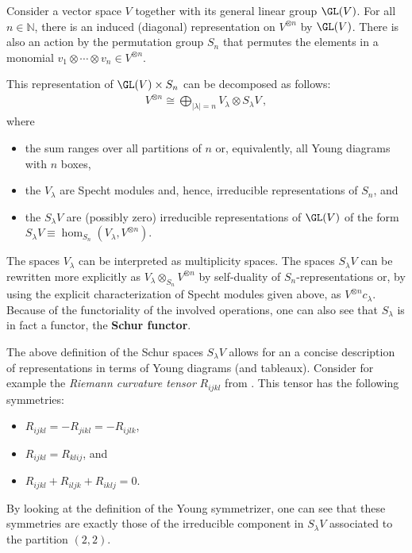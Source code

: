     Consider a vector space $V$ together with its general linear group $\GL(V)$. For all $n\in\mathbb{N}$, there is an induced (diagonal) representation on $V^{\otimes n}$ by $\GL(V)$. There is also an action by the permutation group $S_n$ that permutes the elements in a monomial $v_1\otimes\cdots\otimes v_n\in V^{\otimes n}$.
    \begin{theorem}
        This representation of $\GL(V)\times S_n$ can be decomposed as follows:
        \begin{gather}
            V^{\otimes n}\cong\bigoplus_{|\lambda|=n}V_\lambda\otimes S_\lambda V\,,
        \end{gather}
        where
        \begin{itemize}
            \item the sum ranges over all partitions of $n$ or, equivalently, all Young diagrams with $n$ boxes,
            \item the $V_\lambda$ are Specht modules and, hence, irreducible representations of $S_n$, and
            \item the $S_\lambda V$ are (possibly zero) irreducible representations of $\GL(V)$ of the form $S_\lambda V \equiv\hom_{S_n}(V_\lambda,V^{\otimes n})$.
        \end{itemize}
    \end{theorem}
    The spaces $V_\lambda$ can be interpreted as multiplicity spaces. The spaces $S_\lambda V$ can be rewritten more explicitly as $V_\lambda\otimes_{S_n} V^{\otimes n}$ by self-duality of $S_n$-representations or, by using the explicit characterization of Specht modules given above, as $V^{\otimes n}c_\lambda$. Because of the functoriality of the involved operations, one can also see that $S_\lambda$ is in fact a functor, the \textbf{Schur functor}.

    \begin{example}
        The above definition of the Schur spaces $S_\lambda V$ allows for an a concise description of representations in terms of Young diagrams (and tableaux). Consider for example the \textit{Riemann curvature tensor} $R_{ijkl}$ from . This tensor has the following symmetries:
        \begin{itemize}
            \item $R_{ijkl} = -R_{jikl} = -R_{ijlk}$,
            \item $R_{ijkl} = R_{klij}$, and
            \item $R_{ijkl} + R_{iljk} + R_{iklj} = 0$.
        \end{itemize}
        By looking at the definition of the Young symmetrizer, one can see that these symmetries are exactly those of the irreducible component in $S_\lambda V$ associated to the partition $(2,2)$.
    \end{example}

